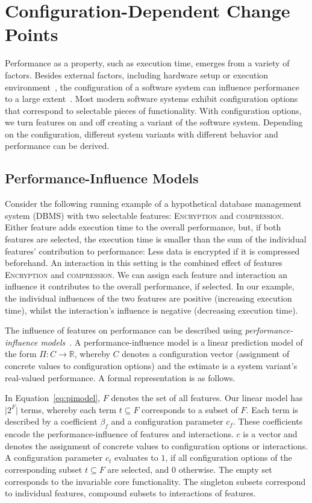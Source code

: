 \documentclass[sigconf]{acmart}
\begin{document}
	\section{Configuration-Dependent Change Points}
	Performance as a property, such as execution time, emerges from a variety of factors.
	Besides external factors, including hardware setup or execution environment~\cite{ousterhout_always_2018}, the configuration  of a software system can influence performance to a large extent~\cite{siegmundPredictingPerformanceAutomated2012}.
	Most modern software systems exhibit configuration options that correspond to selectable pieces of functionality.
	With configuration options, we turn features on and off creating a variant of the software system.
	Depending on the configuration, different system variants with different behavior and performance can be derived.
	
	\subsection{Performance-Influence Models}\label{sec:pimodels}
	Consider the following running example of a hypothetical database management system (DBMS) with two selectable features: \textsc{Encryption} and \textsc{compression}.
	Either feature adds execution time to the overall performance, but, if both features are selected, the execution time is smaller than the sum of the individual features' contribution to performance: Less data is encrypted if it is compressed beforehand.
	An interaction in this setting is the combined effect of features \textsc{Encryption} and \textsc{compression}.
	We can assign each feature and interaction an influence it contributes to the overall performance, if selected. In our example, the individual influences of the two features are positive (increasing execution time), whilst the interaction's influence is negative (decreasing execution time).
	
	The influence of features on performance can be described using \emph{performance-influence models}~\cite{siegmundPerformanceinfluenceModelsHighly2015}.
	A performance-influence model is a linear prediction model of the form $\Pi:C\rightarrow \mathbb{R}$, whereby $C$ denotes a configuration vector (assignment of concrete values to configuration options) and the estimate is a system variant's real-valued performance.
	A formal representation is as follows.
	
	In Equation~\ref{eq:pimodel}, $F$ denotes the set of all features. Our linear model has $\vert 2^F\vert$ terms, whereby each term $t \subseteq F$ corresponds to a subset of $F$. Each term is described by a coefficient $\beta_f$ and a configuration parameter $c_f$.
	These coefficients encode the performance-influence of features and interactions. $c$ is a vector and denotes the assignment of concrete values to configuration options or interactions. A configuration parameter $c_t$ evaluates to $1$, if all configuration options of the corresponding subset $t \subseteq F$ are selected, and $0$ otherwise. The empty set corresponds to the invariable core functionality. The singleton subsets correspond to individual features, compound subsets to interactions of features.
	
\end{document}
